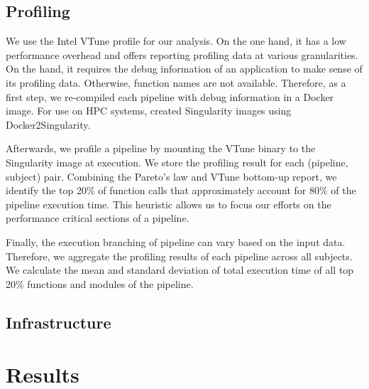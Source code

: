 \documentclass[conference]{IEEEtran}
\begin{document}


\subsection{Profiling}
We use the Intel VTune profile for our analysis. On the one hand, it has a low performance overhead and offers reporting profiling data at various granularities. On the hand, it requires the debug information of an application to make sense of its profiling data. Otherwise, function names are not available. Therefore, as a first step, we re-compiled each pipeline with debug information in a Docker image. For use on HPC systems, created Singularity images using Docker2Singularity.

Afterwards, we profile a pipeline by mounting the VTune binary to the Singularity image at execution. We store the profiling result for each (pipeline, subject) pair. Combining the Pareto's law and VTune bottom-up report, we identify the top 20\% of function calls that approximately account for 80\% of the pipeline execution time. This heuristic allows us to focus our efforts on the performance critical sections of a pipeline.

Finally, the execution branching of pipeline can vary based on the input data. Therefore, we aggregate the profiling results of each pipeline across all subjects. We calculate the mean and standard deviation of total execution time of all top 20\% functions and modules of the pipeline.

\subsection{Infrastructure}

\section{Results}
\end{document}

